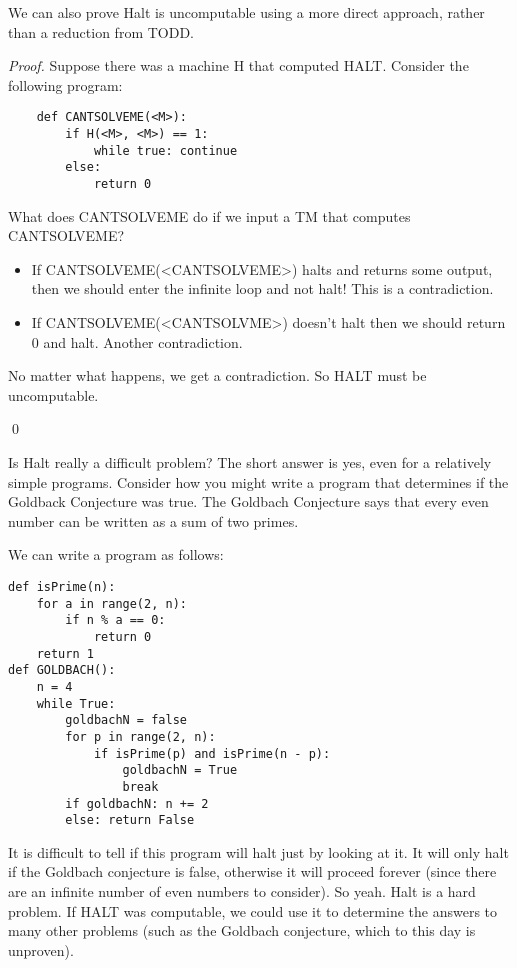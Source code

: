 We can also prove Halt is uncomputable using a more direct approach, rather than a reduction from TODD. 

\begin{proof}
    
    Suppose there was a machine H that computed HALT. Consider the following program:

    \begin{verbatim}
    def CANTSOLVEME(<M>):
        if H(<M>, <M>) == 1:
            while true: continue
        else:
            return 0
    \end{verbatim}

    What does CANTSOLVEME do if we input a TM that computes CANTSOLVEME?
    \begin{itemize}
        \item If CANTSOLVEME(<CANTSOLVEME>) halts and returns some output, then we should enter the infinite loop and not halt! This is a contradiction.
        \item If CANTSOLVEME(<CANTSOLVME>) doesn't halt then we should return 0 and halt. Another contradiction.
    \end{itemize}
    No matter what happens, we get a contradiction. So HALT must be uncomputable.

    \qed

\end{proof}

Is Halt really a difficult problem? The short answer is yes, even for a relatively simple programs. Consider how you might write a program that determines if the Goldback Conjecture was true. The Goldbach Conjecture says that every even number can be written as a sum of two primes.

We can write a program as follows:

\begin{verbatim}
def isPrime(n):
    for a in range(2, n):
        if n % a == 0:
            return 0
    return 1
def GOLDBACH():
    n = 4
    while True:
        goldbachN = false
        for p in range(2, n):
            if isPrime(p) and isPrime(n - p):
                goldbachN = True
                break
        if goldbachN: n += 2
        else: return False
\end{verbatim}

It is difficult to tell if this program will halt just by looking at it. It will only halt if the Goldbach conjecture is false, otherwise it will proceed forever (since there are an infinite number of even numbers to consider). So yeah. Halt is a hard problem. If HALT was computable, we could use it to determine the answers to many other problems (such as the Goldbach conjecture, which to this day is unproven).

